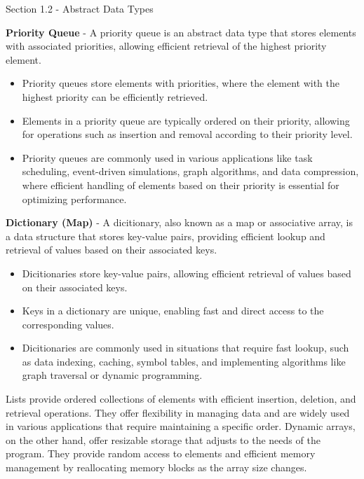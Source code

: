 \begin{notes}{Section 1.2 - Abstract Data Types}
    \begin{highlight}
        \textbf{Priority Queue} - A priority queue is an abstract data type that stores elements with associated priorities, allowing efficient retrieval of the highest priority element.
        \begin{itemize}
            \item Priority queues store elements with priorities, where the element with the highest priority can be efficiently retrieved.
            \item Elements in a priority queue are typically ordered on their priority, allowing for operations such as insertion and removal according to their priority level.
            \item Priority queues are commonly used in various applications like task scheduling, event-driven simulations, graph algorithms, and data compression, where efficient handling of elements
            based on their priority is essential for optimizing performance.
        \end{itemize}
    \end{highlight}

    \begin{highlight}
        \textbf{Dictionary (Map)} - A dicitionary, also known as a map or associative array, is a data structure that stores key-value pairs, providing efficient lookup and retrieval of values
        based on their associated keys.
        \begin{itemize}
            \item Dicitionaries store key-value pairs, allowing efficient retrieval of values based on their associated keys.
            \item Keys in a dictionary are unique, enabling fast and direct access to the corresponding values.
            \item Dicitionaries are commonly used in situations that require fast lookup, such as data indexing, caching, symbol tables, and implementing algorithms like graph traversal or dynamic programming.
        \end{itemize}
    \end{highlight}
    
    Lists provide ordered collections of elements with efficient insertion, deletion, and retrieval operations. They offer flexibility in managing data and are widely used in various applications that
    require maintaining a specific order. Dynamic arrays, on the other hand, offer resizable storage that adjusts to the needs of the program. They provide random access to elements and efficient memory management
    by reallocating memory blocks as the array size changes.
    

\end{notes}
